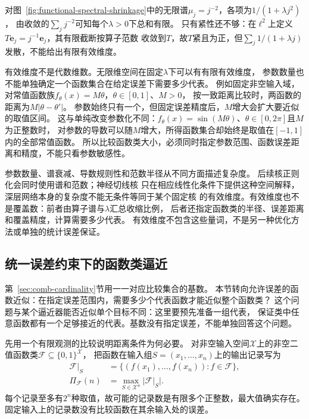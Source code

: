 对图~\ref{fig:functional-spectral-shrinkage}中的无限谱$\mu_j=j^{-2}$，各项为$1/(1+\lambda j^2)$，
由收敛的$\sum_j j^{-2}$可知每个$\lambda>0$下总和有限。
只有紧性还不够：在$\ell^2$上定义$T\bm e_j=j^{-1}\bm e_j$，其有限截断按算子范数
收敛到$T$，故$T$紧且为正，但$\sum_j1/(1+\lambda j)$发散，不能给出有限有效维度。

有效维度不是代数维数。无限维空间在固定$\lambda$下可以有有限有效维度，
参数数量也不能单独确定一个函数集合在给定误差下需要多少代表。
例如固定非空输入域，对常值函数族$f_\theta(x)=M\theta$，$\theta\in[0,1]$、$M>0$，
按一致距离比较时，两函数的距离为$M|\theta-\theta'|$。
参数始终只有一个，但固定误差精度后，$M$增大会扩大要近似的取值区间。
这与单纯改变参数化不同：$f_\theta(x)=\sin(M\theta)$、$\theta\in[0,2\pi]$且$M$为正整数时，
对参数的导数可以随$M$增大，所得函数集合却始终是取值在$[-1,1]$内的全部常值函数。
所以比较函数类大小，必须同时指定参数范围、函数误差距离和精度，不能只看参数敏感性。

参数数量、谱衰减、导数规则性和范数半径从不同方面描述复杂度。
后续核正则化会同时使用谱和范数；神经切线核
只在相应线性化条件下提供这种空间解释，深层网络本身的复杂度不能无条件等同于某个固定核
的有效维度。有效维度也不是覆盖数：前者由算子谱与$\lambda$汇总收缩比例，
后者还指定函数类的半径、误差距离和覆盖精度，计算需要多少代表。
有效维度不包含这些量词，不是另一种优化方法或单独的统计误差保证。

\subsection{统一误差约束下的函数类逼近}
\label{sec:functional-covering-metric-entropy}
\label{sec:functional-combinatorial-metric-complexity}

\label{sec:functional-sequential-classes-low-rank}

第~\ref{sec:comb-cardinality}节用一一对应比较集合的基数。
本节转向允许误差的函数近似：在指定误差范围内，需要多少个代表函数才能近似整个函数类？
这个问题与某个逼近器能否近似单个目标不同：这里要预先准备一组代表，
保证类中任意函数都有一个足够接近的代表。基数没有指定误差，不能单独回答这个问题。

先用一个有限观测的比较说明距离条件为何必要。
对非空输入空间$\mathcal X$上的非空二值函数类$\mathcal F\subseteq\{0,1\}^{\mathcal X}$，
把函数在输入组$S=(x_1,\ldots,x_n)$上的输出记录写为
\begin{equation}
 \begin{aligned}
 \mathcal F|_S&=\{(f(x_1),\ldots,f(x_n)):f\in\mathcal F\},\\
 \Pi_{\mathcal F}(n)&=\max_{S\in\mathcal X^n}\bigl|\mathcal F|_S\bigr|.
 \end{aligned}
 \label{eq:functional-growth-function}
\end{equation}
每个记录至多有$2^n$种取值，故可能的记录数是有限多个正整数，最大值确实存在。
固定输入上的记录数没有比较函数在其余输入处的误差。

